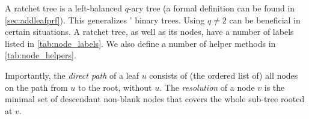 A ratchet tree is a left-balanced $q$-ary tree (a formal definition can be found in \cref{sec:addleafprf}). This generalizes \protITK' binary trees. Using $q\neq2$ can be beneficial in certain situations.
A ratchet tree, as well as its nodes, have a number of labels listed in \cref{tab:node_labels}.
We also define a number of helper methods in \cref{tab:node_helpers}.
%

Importantly, the \emph{direct path} of a leaf $u$ consists of (the ordered list of) all nodes on the path from $u$ to the root, without $u$.
The \emph{resolution} of a node $v$ is the minimal set of descendant non-blank nodes that covers the whole sub-tree rooted at $v$. %


